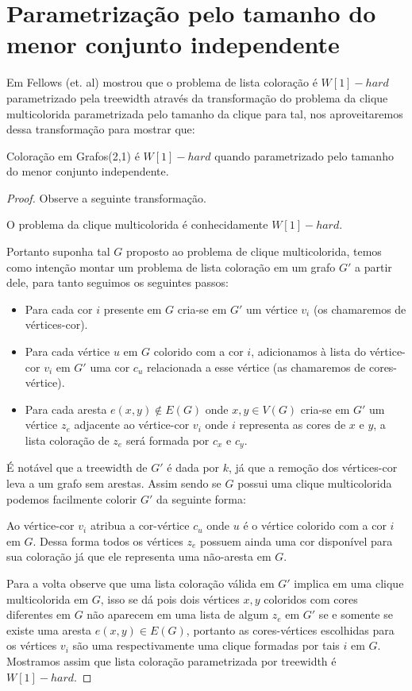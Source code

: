 \section{Parametrização pelo tamanho do menor conjunto independente}
Em \cite{fellows07} Fellows (et. al) mostrou que o problema de lista coloração é $W[1]-hard$ parametrizado pela treewidth através da transformação do problema da clique multicolorida parametrizada pelo tamanho da clique para tal, nos aproveitaremos dessa transformação para mostrar que:
\begin{teorema}
	Coloração em Grafos(2,1) é $W[1]-hard$ quando parametrizado pelo tamanho do menor conjunto independente.
\end{teorema}
\begin{proof}
	Observe a seguinte transformação.
	
	O problema da clique multicolorida é conhecidamente $W[1]-hard$.
	
	Portanto suponha tal $G$ proposto ao problema de clique multicolorida, temos como intenção montar um problema de lista coloração em um grafo $G'$ a partir dele, para tanto seguimos os seguintes passos:
	\begin{itemize}
		\item Para cada cor $i$ presente em $G$ cria-se em $G'$ um vértice $v_i$ (os chamaremos de vértices-cor).
		\item Para cada vértice $u$ em $G$ colorido com a cor $i$, adicionamos à lista do vértice-cor $v_i$ em $G'$ uma cor $c_u$ relacionada a esse vértice (as chamaremos de cores-vértice).
		\item Para cada aresta $e(x,y) \notin E(G)$ onde $x,y \in V(G)$ cria-se em $G'$ um vértice $z_e$ adjacente ao vértice-cor $v_i$ onde $i$ representa as cores de $x$ e $y$, a lista coloração de $z_e$ será formada por $c_x$ e $c_y$.
	\end{itemize}
	É notável que a treewidth de $G'$ é dada por $k$, já que a remoção dos vértices-cor leva a um grafo sem arestas. Assim sendo se $G$ possui uma clique multicolorida podemos facilmente colorir $G'$ da seguinte forma:
	
	Ao vértice-cor $v_i$ atribua a cor-vértice $c_u$ onde $u$ é o vértice colorido com a cor $i$ em $G$. Dessa forma todos os vértices $z_e$ possuem ainda uma cor disponível para sua coloração já que ele representa uma não-aresta em $G$. 
	
	Para a volta observe que uma lista coloração válida em $G'$ implica em uma clique multicolorida em $G$, isso se dá pois dois vértices $x,y$ coloridos com cores diferentes em $G$ não aparecem em uma lista de algum $z_e$ em $G'$ se e somente se existe uma aresta $e(x,y) \in E(G)$, portanto as cores-vértices escolhidas para os vértices $v_i$ são uma respectivamente uma clique formadas por tais $i$ em $G$. Mostramos assim que lista coloração parametrizada por treewidth é $W[1]-hard$.
	

\end{proof}
